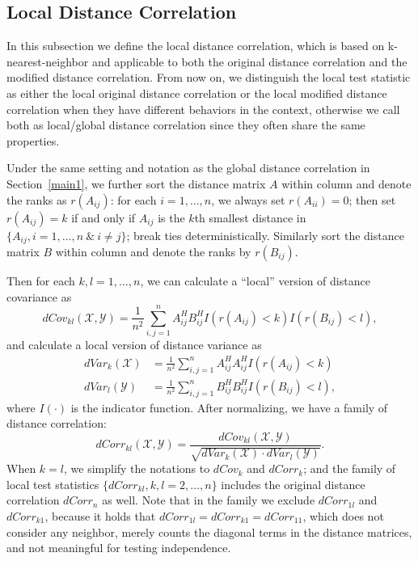 \documentclass[12pt]{article}
\begin{document}
\subsection{Local Distance Correlation}
\label{main2}
In this subsection we define the local distance correlation, which is based on k-nearest-neighbor and applicable to both the original distance correlation and the modified distance correlation. From now on, we distinguish the local test statistic as either the local original distance correlation or the local modified distance correlation when they have different behaviors in the context, otherwise we call both as local/global distance correlation since they often share the same properties.

Under the same setting and notation as the global distance correlation in Section~\ref{main1}, we further sort the distance matrix $A$ within column and denote the ranks as $r(A_{ij})$: for each $i=1, \ldots, n$, we always set $r(A_{ii})=0$; then set $r(A_{ij})=k$ if and only if $A_{ij}$ is the $k$th smallest distance in $\{A_{ij}, i=1,\ldots,n\ \& \ i \neq j\}$; break ties deterministically. Similarly sort the distance matrix $B$ within column and denote the ranks by $r(B_{ij})$.

Then for each $k,l=1,\ldots,n$, we can calculate a ``local'' version of distance covariance as
\begin{equation}
\label{localdCovEqu}
dCov_{kl}(\mathcal{X},\mathcal{Y})=\frac{1}{n^2}\sum_{i,j=1}^{n}A^{H}_{ij}B^{H}_{ij}I(r(A_{ij})<k)I(r(B_{ij})<l),
\end{equation}
and calculate a local version of distance variance as
\begin{align*}
dVar_{k}(\mathcal{X}) &=\frac{1}{n^2}\sum_{i,j=1}^{n}A^{H}_{ij}A^{H}_{ij}I(r(A_{ij})<k)\\
dVar_{l}(\mathcal{Y}) &=\frac{1}{n^2}\sum_{i,j=1}^{n}B^{H}_{ij}B^{H}_{ij}I(r(B_{ij})<l),
\end{align*}
where $I(\cdot)$ is the indicator function. After normalizing, we have a family of distance correlation:
\begin{equation}
\label{localdCorrEqu}
dCorr_{kl}(\mathcal{X},\mathcal{Y})=\frac{dCov_{kl}(\mathcal{X},\mathcal{Y})}{\sqrt{dVar_{k}(\mathcal{X}) \cdot dVar_{l}(\mathcal{Y})}}.
\end{equation}
When $k=l$, we simplify the notations to $dCov_{k}$ and $dCorr_{k}$; and the family of local test statistics $\{dCorr_{kl}, k,l=2,\ldots,n\}$ includes the original distance correlation $dCorr_{n}$ as well. Note that in the family we exclude $dCorr_{1l}$ and $dCorr_{k1}$, because it holds that $dCorr_{1l}=dCorr_{k1}=dCorr_{11}$, which does not consider any neighbor, merely counts the diagonal terms in the distance matrices, and not meaningful for testing independence.
\end{document}
